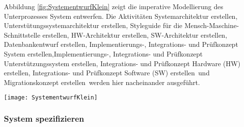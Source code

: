 Abbildung \ref{fig:SystementwurfKlein} zeigt die imperative Modellierung des Unterprozesses \grqq System entwerfen\grqq.
Die Aktivitäten \grqq Systemarchitektur erstellen\grqq, \grqq Unterstütungssystemarchitektur erstellen\grqq, \grqq Styleguide für die Mensch-Maschine-Schnittstelle erstellen\grqq, \grqq HW-Architektur erstellen\grqq, \grqq SW-Architektur erstellen\grqq, \grqq Datenbankentwurf erstellen\grqq, \grqq Implementierungs-, Integrations- und Prüfkonzept System erstellen\grqq,\grqq Implementierungs-, Integrations- und Prüfkonzept Unterstützungssystem erstellen\grqq, \grqq Integrations- und Prüfkonzept Hardware (HW) erstellen\grqq, \grqq Integrations- und Prüfkonzept Software (SW) erstellen\grqq \ und \grqq Migrationskonzept erstellen\grqq \ werden hier nacheinander ausgeführt.
\begin{sidewaysfigure}[!htbp]
\begin{center}
  \texttt{[image: SystementwurfKlein]} %
  \caption{System entwerfen V-Modell XT - imperativ}
  \label{fig:SystementwurfKlein}
\end{center}
\end{sidewaysfigure}


\subsubsection{System spezifizieren}

